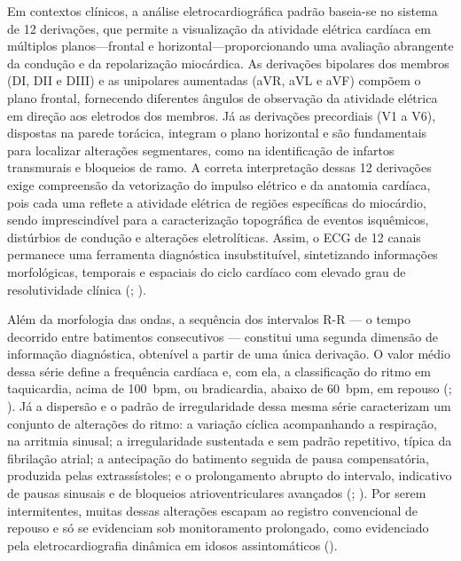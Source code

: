 Em contextos clínicos, a análise eletrocardiográfica padrão baseia-se no sistema de 12 derivações, que permite a visualização da atividade elétrica cardíaca em múltiplos planos—frontal e horizontal—proporcionando uma avaliação abrangente da condução e da repolarização miocárdica. As derivações bipolares dos membros (DI, DII e DIII) e as unipolares aumentadas (aVR, aVL e aVF) compõem o plano frontal, fornecendo diferentes ângulos de observação da atividade elétrica em direção aos eletrodos dos membros. Já as derivações precordiais (V1 a V6), dispostas na parede torácica, integram o plano horizontal e são fundamentais para localizar alterações segmentares, como na identificação de infartos transmurais e bloqueios de ramo. A correta interpretação dessas 12 derivações exige compreensão da vetorização do impulso elétrico e da anatomia cardíaca, pois cada uma reflete a atividade elétrica de regiões específicas do miocárdio, sendo imprescindível para a caracterização topográfica de eventos isquêmicos, distúrbios de condução e alterações eletrolíticas. Assim, o ECG de 12 canais permanece uma ferramenta diagnóstica insubstituível, sintetizando informações morfológicas, temporais e espaciais do ciclo cardíaco com elevado grau de resolutividade clínica (; ).

Além da morfologia das ondas, a sequência dos intervalos R-R --- o tempo decorrido entre batimentos consecutivos --- constitui uma segunda dimensão de informação diagnóstica, obtenível a partir de uma única derivação. O valor médio dessa série define a frequência cardíaca e, com ela, a classificação do ritmo em taquicardia, acima de 100~bpm, ou bradicardia, abaixo de 60~bpm, em repouso (; ). Já a dispersão e o padrão de irregularidade dessa mesma série caracterizam um conjunto de alterações do ritmo: a variação cíclica acompanhando a respiração, na arritmia sinusal; a irregularidade sustentada e sem padrão repetitivo, típica da fibrilação atrial; a antecipação do batimento seguida de pausa compensatória, produzida pelas extrassístoles; e o prolongamento abrupto do intervalo, indicativo de pausas sinusais e de bloqueios atrioventriculares avançados (; ). Por serem intermitentes, muitas dessas alterações escapam ao registro convencional de repouso e só se evidenciam sob monitoramento prolongado, como evidenciado pela eletrocardiografia dinâmica em idosos assintomáticos ().

